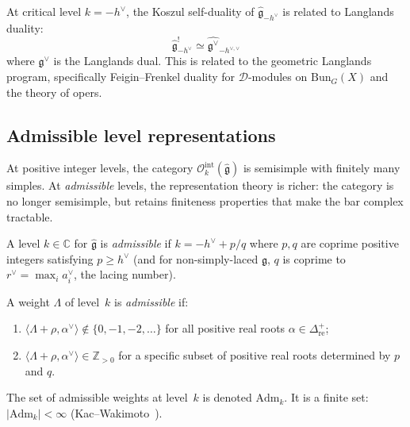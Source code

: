 \begin{remark}
At critical level $k = -h^\vee$, the Koszul self-duality of $\widehat{\mathfrak{g}}_{-h^\vee}$ is related to Langlands duality:
\begin{equation}
\widehat{\mathfrak{g}}_{-h^\vee}^! \simeq \widehat{\mathfrak{g}^\vee}_{-h^{\vee,\vee}}
\end{equation}
where $\mathfrak{g}^\vee$ is the Langlands dual.  This is related to the
geometric Langlands program, specifically Feigin--Frenkel duality for
$\mathcal{D}$-modules on $\mathrm{Bun}_G(X)$ and the theory of opers.
\end{remark}

\subsection{Admissible level representations}
\label{sec:admissible-level-reps}

At positive integer levels, the category
$\mathcal{O}_k^{\mathrm{int}}(\widehat{\mathfrak{g}})$ is
semisimple with finitely many simples.  At \emph{admissible}
levels, the representation theory is richer: the category is
no longer semisimple, but retains finiteness properties that make
the bar complex tractable.

\begin{definition}
\label{def:admissible-level}
A level $k \in \mathbb{C}$ for $\widehat{\mathfrak{g}}$ is
\emph{admissible} if $k = -h^\vee + p/q$ where $p, q$ are
coprime positive integers satisfying $p \geq h^\vee$ (and for
non-simply-laced $\mathfrak{g}$, $q$ is coprime to
$r^\vee = \max_i a_i^\vee$, the lacing number).

A weight $\Lambda$ of level~$k$ is \emph{admissible} if:
\begin{enumerate}[label=\textup{(\roman*)}]
\item $\langle \Lambda + \rho, \alpha^\vee \rangle \notin
  \{0, -1, -2, \ldots\}$ for all positive real roots
  $\alpha \in \Delta^+_{\mathrm{re}}$;
\item $\langle \Lambda + \rho, \alpha^\vee \rangle \in
  \mathbb{Z}_{> 0}$ for a specific subset of positive real roots
  determined by $p$ and $q$.
\end{enumerate}
The set of admissible weights at level~$k$ is denoted $\mathrm{Adm}_k$.
It is a finite set: $|\mathrm{Adm}_k| < \infty$
(Kac--Wakimoto~\cite{KW88}).
\end{definition}

